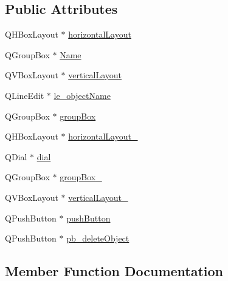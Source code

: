 \subsection*{Public Attributes}
\begin{DoxyCompactItemize}
\item 
Q\+H\+Box\+Layout $\ast$ \hyperlink{class_ui___object_settings_a17d0e29ba40f17b5b637e2954d99f570}{horizontal\+Layout}
\item 
Q\+Group\+Box $\ast$ \hyperlink{class_ui___object_settings_a67cc69d051ed2f4f4e87c0c6036206f3}{Name}
\item 
Q\+V\+Box\+Layout $\ast$ \hyperlink{class_ui___object_settings_a144f8a5ac696bb4e37a59ef120979f9c}{vertical\+Layout}
\item 
Q\+Line\+Edit $\ast$ \hyperlink{class_ui___object_settings_af08ab8f78ce1dd569c6c82635086fadc}{le\+\_\+object\+Name}
\item 
Q\+Group\+Box $\ast$ \hyperlink{class_ui___object_settings_ab73a086c80ad3ff9a53a6aefad85c638}{group\+Box}
\item 
Q\+H\+Box\+Layout $\ast$ \hyperlink{class_ui___object_settings_a1d861c576f62b410578b647f5a817349}{horizontal\+Layout\+\_}
\item 
Q\+Dial $\ast$ \hyperlink{class_ui___object_settings_a824088c070ce22d771e63f62226e179f}{dial}
\item 
Q\+Group\+Box $\ast$ \hyperlink{class_ui___object_settings_a51ffb8d6ab112c3aa5ffa5389084f1f2}{group\+Box\+\_}
\item 
Q\+V\+Box\+Layout $\ast$ \hyperlink{class_ui___object_settings_aadf65497907ac8aca787add49f46a20d}{vertical\+Layout\+\_}
\item 
Q\+Push\+Button $\ast$ \hyperlink{class_ui___object_settings_ac57e5762b345fd94aaca1a09a03ccb73}{push\+Button}
\item 
Q\+Push\+Button $\ast$ \hyperlink{class_ui___object_settings_af39b0ad3b6d8a76b47c82185fc4690f0}{pb\+\_\+delete\+Object}
\end{DoxyCompactItemize}


\subsection{Member Function Documentation}
\mbox{\label{class_ui___object_settings_a412f3bf2df2d7bbcc4e67bf038566aaa}} 

